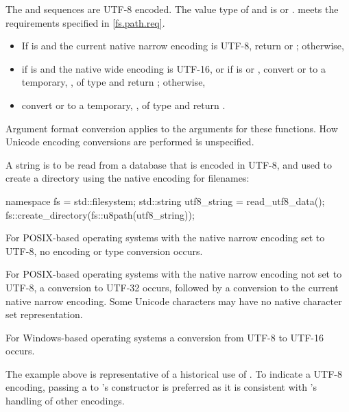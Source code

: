 \begin{itemdescr}
\pnum
\requires The  and 
  sequences are UTF-8 encoded. The value type of 
  and  is  or .
   meets the requirements specified in \ref{fs.path.req}.

\pnum
\returns
\begin{itemize}
\item If  is  and the current native
      narrow encoding is UTF-8,
      return  or ;
      otherwise,
\item if  is  and the
      native wide encoding is UTF-16, or
      if  is  or ,
      convert  or 
      to a temporary, , of type  and
      return ;
      otherwise,
\item convert  or 
      to a temporary, , of type  and
      return .
\end{itemize}

\pnum
\remarks
Argument format conversion applies to the
  arguments for these functions. How Unicode encoding conversions are performed is
  unspecified.

\pnum
\begin{example}
A string is to be read from a database that is encoded in UTF-8, and used
    to create a directory using the native encoding for filenames:
\begin{codeblock}
namespace fs = std::filesystem;
std::string utf8_string = read_utf8_data();
fs::create_directory(fs::u8path(utf8_string));
\end{codeblock}

For POSIX-based operating systems with the native narrow encoding set
    to UTF-8, no encoding or type conversion occurs.

For POSIX-based operating systems with the native narrow encoding not
    set to UTF-8, a conversion to UTF-32 occurs, followed by a conversion to the
    current native narrow encoding. Some Unicode characters may have no native character
    set representation.

For Windows-based operating systems a conversion from UTF-8 to
    UTF-16 occurs.
\end{example}
\begin{note}
The example above is representative of
a historical use of .
To indicate a UTF-8 encoding,
passing a  to 's constructor is preferred
as it is consistent with 's handling of other encodings.
\end{note}
\end{itemdescr}


